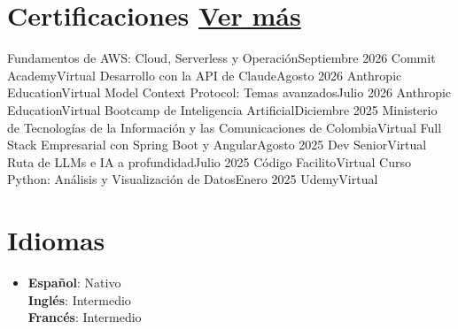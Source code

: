 \documentclass[letterpaper,12pt]{fed-res}
\begin{document}
\section{Certificaciones \hfill \href{\urlCertsEs}{Ver más}}
\resumeSubHeadingListStart
    \resumeSubheading
        {Fundamentos de AWS: Cloud, Serverless y Operación}{Septiembre 2026}
        {Commit Academy}{Virtual}
    \resumeSubheading
        {Desarrollo con la API de Claude}{Agosto 2026}
        {Anthropic Education}{Virtual}
    \resumeSubheading
        {Model Context Protocol: Temas avanzados}{Julio 2026}
        {Anthropic Education}{Virtual}
    \resumeSubheading
        {Bootcamp de Inteligencia Artificial}{Diciembre 2025}
        {Ministerio de Tecnologías de la Información y las Comunicaciones de Colombia}{Virtual}
    \resumeSubheading
        {Full Stack Empresarial con Spring Boot y Angular}{Agosto 2025}
        {Dev Senior}{Virtual}
    \resumeSubheading
        {Ruta de LLMs e IA a profundidad}{Julio 2025}
        {Código Facilito}{Virtual}
    \resumeSubheading
        {Curso Python: Análisis y Visualización de Datos}{Enero 2025}
        {Udemy}{Virtual}
\resumeSubHeadingListEnd

\section{Idiomas}
\begin{itemize}[leftmargin=0.15in, label={}]
    \item{
        \textbf{Español}{: Nativo} \\
        \textbf{Inglés}{: Intermedio} \\
        \textbf{Francés}{: Intermedio}
    }
\end{itemize}
\end{document}
